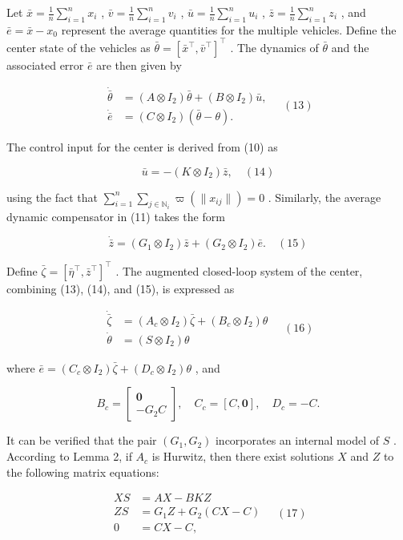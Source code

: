 Let  $\bar{x} = \frac{1}{n} \sum_{i=1}^n x_i$ ,  $\bar{v} = \frac{1}{n} \sum_{i=1}^n v_i$ ,  $\bar{u} = \frac{1}{n} \sum_{i=1}^n u_i$ ,  $\bar{z} = \frac{1}{n} \sum_{i=1}^n z_i$ , and  $\bar{e} = \bar{x} - x_0$  represent the average quantities for the multiple vehicles. Define the center state of the vehicles as  $\bar{\theta} = [\bar{x}^\top, \bar{v}^\top]^\top$ . The dynamics of  $\bar{\theta}$  and the associated error  $\bar{e}$  are then given by

$$\begin{aligned} \dot{\bar{\theta}} &= (A \otimes I_2) \bar{\theta} + (B \otimes I_2) \bar{u}, \\ \dot{\bar{e}} &= (C \otimes I_2)(\bar{\theta} - \theta). \end{aligned} \quad (13)$$

The control input for the center is derived from (10) as

$$\bar{u} = -(K \otimes I_2)\bar{z}, \quad (14)$$

using the fact that  $\sum_{i=1}^n \sum_{j \in \mathbb{N}_i} \varpi(\|x_{ij}\|) = 0$ . Similarly, the average dynamic compensator in (11) takes the form

$$\dot{\bar{z}} = (G_1 \otimes I_2)\bar{z} + (G_2 \otimes I_2)\bar{e}. \quad (15)$$

Define  $\bar{\zeta} = [\bar{\eta}^\top, \bar{z}^\top]^\top$ . The augmented closed-loop system of the center, combining (13), (14), and (15), is expressed as

$$\begin{aligned} \dot{\bar{\zeta}} &= (A_c \otimes I_2)\bar{\zeta} + (B_c \otimes I_2)\theta \\ \dot{\theta} &= (S \otimes I_2)\theta \end{aligned} \quad (16)$$

where  $\bar{e} = (C_c \otimes I_2)\bar{\zeta} + (D_c \otimes I_2)\theta$ , and

$$B_c = \begin{bmatrix} \mathbf{0} \\ -G_2 C \end{bmatrix}, \quad C_c = [C, \mathbf{0}], \quad D_c = -C.$$

It can be verified that the pair  $(G_1, G_2)$  incorporates an internal model of  $S$ . According to Lemma 2, if  $A_c$  is Hurwitz, then there exist solutions  $X$  and  $Z$  to the following matrix equations:

$$\begin{aligned} XS &= AX - BKZ \\ ZS &= G_1 Z + G_2(CX - C) \\ 0 &= CX - C, \end{aligned} \quad (17)$$

